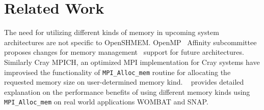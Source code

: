 \section{Related Work}
\label{src:relate}
The need for utilizing different kinds of memory %
in upcoming system architectures are not specific to
OpenSHMEM. %
OpenMP~\cite{openmp} Affinity subcommittee proposes changes
for memory management~\cite{omp-tr5} support for future architectures.
Similarly Cray MPICH, an optimized MPI
implementation for Cray systems have improvised the functionality of
\texttt{MPI\_Alloc\_mem} routine for allocating the requested
memory size on user-determined
memory kind. ~\citeauthor{cug17-krishna}
provides detailed explanation on the performance benefits of using
different
memory kinds using \texttt{MPI\_Alloc\_mem} on real world
applications WOMBAT and SNAP.
